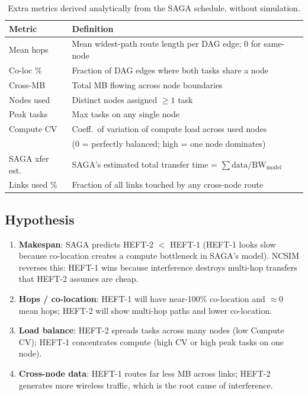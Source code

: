 \documentclass[11pt]{article}
\begin{document}
\begin{table}[H]
\centering
\begin{tabular}{ll}
\toprule
\textbf{Metric} & \textbf{Definition} \\
\midrule
Mean hops       & Mean widest-path route length per DAG edge; 0 for same-node \\
Co-loc \%       & Fraction of DAG edges where both tasks share a node \\
Cross-MB        & Total MB flowing across node boundaries \\
Nodes used      & Distinct nodes assigned $\geq 1$ task \\
Peak tasks      & Max tasks on any single node \\
Compute CV      & Coeff.\ of variation of compute load across used nodes \\
                & (0 = perfectly balanced; high = one node dominates) \\
SAGA xfer est.  & SAGA's estimated total transfer time = $\sum \text{data}/\text{BW}_{\text{model}}$\\
Links used \%   & Fraction of all links touched by any cross-node route \\
\bottomrule
\end{tabular}
\caption{Extra metrics derived analytically from the SAGA schedule, without simulation.}
\end{table}

\subsection{Hypothesis}

\begin{enumerate}
  \item \textbf{Makespan}: SAGA predicts HEFT-2 $<$ HEFT-1 (HEFT-1 looks slow because
        co-location creates a compute bottleneck in SAGA's model).
        NCSIM reverses this: HEFT-1 wins because interference destroys multi-hop
        transfers that HEFT-2 assumes are cheap.
  \item \textbf{Hops / co-location}: HEFT-1 will have near-100\% co-location and
        $\approx0$ mean hops; HEFT-2 will show multi-hop paths and lower co-location.
  \item \textbf{Load balance}: HEFT-2 spreads tasks across many nodes (low Compute CV);
        HEFT-1 concentrates compute (high CV or high peak tasks on one node).
  \item \textbf{Cross-node data}: HEFT-1 routes far less MB across links; HEFT-2
        generates more wireless traffic, which is the root cause of interference.
\end{enumerate}
\end{document}
